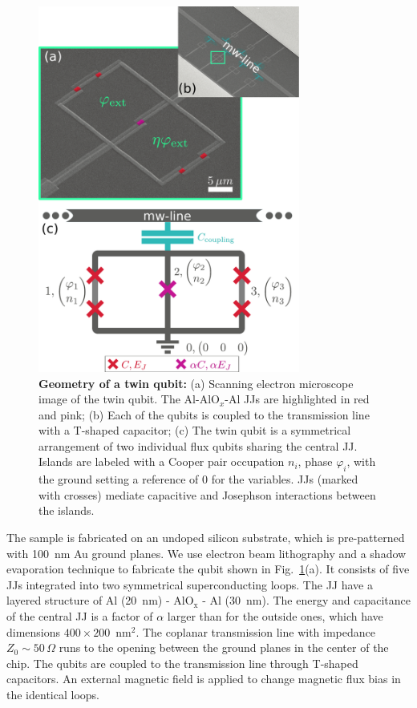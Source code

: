 \documentclass[%
reprint,
superscriptaddress,
bibnotes,
amsmath,
amssymb,
aps,
showkeys,
prb,
]{revtex4-1}
\begin{document}
\begin{figure}[htp]
\centering
  \includegraphics[width=8.6cm]{fig1}
  \caption{\small  \textbf{Geometry  of a  twin  qubit:}  (a) Scanning  electron
    microscope image of the twin qubit. The Al-AlO$_x$-Al JJs are highlighted in
    red and  pink; (b) Each  of the qubits is  coupled to the  transmission line
    with a T-shaped  capacitor; (c) The twin qubit is  a symmetrical arrangement
    of two individual  flux qubits \cite{Orlando_1999} sharing
    the central  JJ.  Islands are labeled  with a Cooper pair  occupation $n_i$,
    phase $\varphi_i$, with the  ground setting a reference of 0 for
    the variables.   JJs  (marked with  crosses)  mediate capacitive  and
    Josephson  interactions between  the islands.
  }
  \label{fig:setup}
\end{figure}

The sample is fabricated on an undoped silicon substrate, which is
pre-patterned with 100~nm Au ground planes. We  use electron beam lithography 
and a shadow evaporation  technique to fabricate the qubit shown in
Fig.~\ref{fig:setup}(a). It consists of five JJs integrated into two
symmetrical  superconducting  loops. The  JJ  have  a   layered  structure  of
Al (20~nm) - AlO$_{\text{x}}$ - Al (30~nm).  The energy  and  capacitance of  the
central JJ  is a  factor of  $\alpha$ larger than  for the  outside ones,  which have
dimensions $400\times200$~nm$^2$.    The  coplanar  transmission   line  with
impedance $ Z_{0} \sim 50\,\Omega $ runs to the opening between the ground planes in the
center of the chip. The qubits are coupled to the transmission line
through T-shaped  capacitors.  An external magnetic field is applied to change magnetic flux bias in the identical loops.
\end{document}
